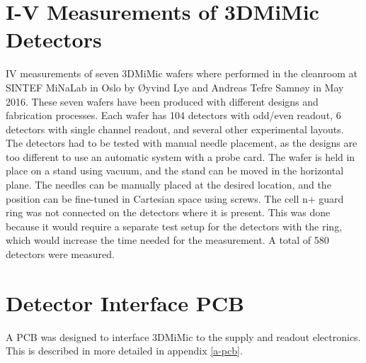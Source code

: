 \documentclass[../main/thesis.tex]{subfiles}
\begin{document}
\section{I-V Measurements of 3DMiMic Detectors}
\label{3d-IV}
\gls{IV} measurements of seven 3DMiMic wafers where performed in the cleanroom at SINTEF MiNaLab in Oslo by Øyvind Lye and Andreas Tefre Samnøy in May 2016. These seven wafers have been produced with different designs and fabrication processes. Each wafer has 104 detectors with odd/even readout, 6 detectors with single channel readout, and several other experimental layouts. The detectors had to be tested with manual needle placement, as the designs are too different to use an automatic system with a probe card. The wafer is held in place on a stand using vacuum, and the stand can be moved in the horizontal plane. The needles can be manually placed at the desired location, and the position can be fine-tuned in Cartesian space using screws. The cell n+ guard ring was not connected on the detectors where it is present. This was done because it would require a separate test setup for the detectors with the ring, which would increase the time needed for the measurement. A total of 580 detectors were measured. 

\section{Detector Interface PCB}
\label{3d-pcb}
A \gls{PCB} was designed to interface 3DMiMic to the supply and readout electronics. This is described in more detailed in appendix \ref{a-pcb}.
\end{document}
